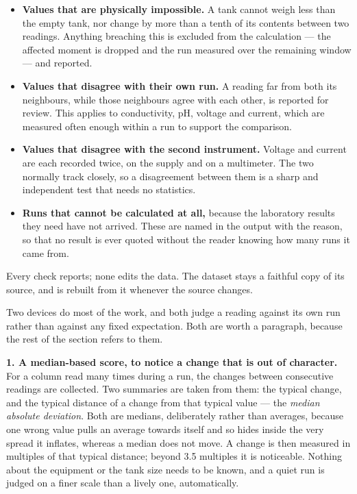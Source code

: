 \documentclass[11pt,a4paper]{article}
\begin{document}
\begin{itemize}[nosep]
  \item \textbf{Values that are physically impossible.} A tank cannot weigh less than the
        empty tank, nor change by more than a tenth of its contents between two readings.
        Anything breaching this is excluded from the calculation --- the affected moment is
        dropped and the run measured over the remaining window --- and reported.
  \item \textbf{Values that disagree with their own run.} A reading far from both its
        neighbours, while those neighbours agree with each other, is reported for review. This
        applies to conductivity, pH, voltage and current, which are measured often enough
        within a run to support the comparison.
  \item \textbf{Values that disagree with the second instrument.} Voltage and current are
        each recorded twice, on the supply and on a multimeter. The two normally track closely,
        so a disagreement between them is a sharp and independent test that needs no statistics.
  \item \textbf{Runs that cannot be calculated at all,} because the laboratory results they
        need have not arrived. These are named in the output
        with the reason, so that no result is ever quoted without the reader knowing how many
        runs it came from.
\end{itemize}

Every check reports; none edits the data. The dataset stays a faithful copy of its source, and
is rebuilt from it whenever the source changes.

Two devices do most of the work, and both judge a reading against its own run rather than
against any fixed expectation. Both are worth a paragraph, because the rest of the section
refers to them.

\textbf{1. A median-based score, to notice a change that is out of character.} For a column
read many times during a run, the changes between consecutive readings are collected. Two
summaries are taken from them: the typical change, and the typical distance of a change from
that typical value --- the \emph{median absolute deviation}. Both are medians, deliberately
rather than averages, because one wrong value pulls an average towards itself and so hides
inside the very spread it inflates, whereas a median does not move. A change is then measured in
multiples of that typical distance; beyond 3.5 multiples it is noticeable. Nothing about the
equipment or the tank size needs to be known, and a quiet run is judged on a finer scale than a
lively one, automatically.
\end{document}
